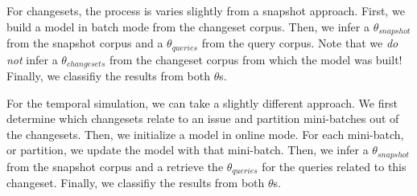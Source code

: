 For changesets, the process is varies slightly from a snapshot approach.
First, we build a model in batch mode from the changeset corpus.
Then, we infer a $\theta_{snapshot}$ from the snapshot corpus
and a $\theta_{queries}$ from the query corpus.
Note that we \emph{do not} infer a $\theta_{changesets}$ from the changeset corpus from which the model was built!
Finally, we classifiy the results from both $\theta$s.

\begin{comment}
\begin{enumerate}
    \item Build model from the changeset corpus in batch mode
    \item \emph{Do not} infer a $\theta_{changesets}$
    \item Infer a $\theta_{snapshot}$ from the snapshot corpus
    \item Infer a  $\theta_{queries}$ from the query corpus
    \item Classifiy, or rank, the results from both $\theta$s
\end{enumerate}
\end{comment}


For the temporal simulation, we can take a slightly different approach.
We first determine which changesets relate to an issue and partition mini-batches out of the changesets.
Then, we initialize a model in online mode.
For each mini-batch, or partition, we update the model with that mini-batch.
Then, we infer a $\theta_{snapshot}$ from the snapshot corpus
and a retrieve the $\theta_{queries}$ for the queries related to this changeset.
Finally, we classifiy the results from both $\theta$s.

\begin{comment}
\begin{enumerate}
    \item Initialize a model in online mode
    \item Determine which changesets relate to an issue and partition mini-batches out of the changesets
    \item For each mini-batch:
        \begin{enumerate}
            \item Update the model with mini-batch
            \item Update $\theta_{snapshot}$ with the new inference of the source code document affected by this changeset
            \item Infer a $\theta_{query}$ of the query related to the changeset we stopped at
            \item Classifiy, or rank, the results from both $\theta$s
        \end{enumerate}
\end{enumerate}
\end{comment}


